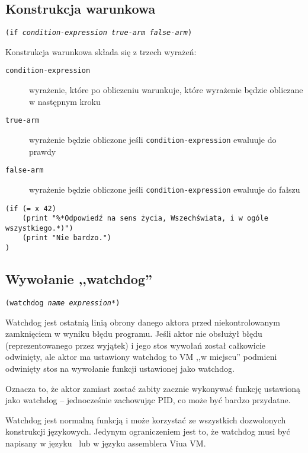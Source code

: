 \subsection{Konstrukcja warunkowa}

\texttt{(if \emph{condition-expression} \emph{true-arm} \emph{false-arm})}
\newline

Konstrukcja warunkowa składa się z trzech wyrażeń:

\begin{description}
    \item[\texttt{condition-expression}] wyrażenie, które po obliczeniu warunkuje, które wyrażenie będzie
        obliczane w następnym kroku
    \item[\texttt{true-arm}] wyrażenie będzie obliczone jeśli \texttt{condition-expression} ewaluuje do prawdy
    \item[\texttt{false-arm}] wyrażenie będzie obliczone jeśli \texttt{condition-expression} ewaluuje do
        fałszu
\end{description}

\begin{lstlisting}
(if (= x 42)
    (print "%*Odpowiedź na sens życia, Wszechświata, i w ogóle wszystkiego.*)")
    (print "Nie bardzo.")
)
\end{lstlisting}

\subsection{Wywołanie ,,watchdog''}

\texttt{(watchdog \emph{name} \emph{expression}*)}
\newline

Watchdog jest ostatnią linią obrony danego aktora przed niekontrolowanym zamknięciem w wyniku błędu programu.
Jeśli aktor nie obsłużył błędu (reprezentowanego przez wyjątek) i jego stos wywołań został całkowicie
odwinięty, ale aktor ma ustawiony watchdog to VM ,,w miejscu'' podmieni odwinięty stos na wywołanie funkcji
ustawionej jako watchdog.

Oznacza to, że aktor zamiast zostać zabity zacznie wykonywać funkcję ustawioną jako watchdog -- jednocześnie
zachowując PID, co może być bardzo przydatne.

Watchdog jest normalną funkcją i może korzystać ze wszystkich dozwolonych konstrukcji językowych.
Jedynym ograniczeniem jest to, że watchdog musi być napisany w języku \ViuAct\ lub w języku assemblera Viua VM.

